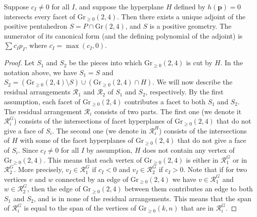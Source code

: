 \documentclass[10pt,a4paper]{amsart}
\begin{document}
\begin{theorem} \label{thm:penta}
    Suppose $c_I\neq 0$ for all $I$, and suppose the hyperplane $H$ defined by $h(\mathbf{p}) = 0$ intersects every facet of $\mathrm{Gr}_{\geq 0}(2,4)$. Then there exists a unique adjoint of the positive pentahedron $S = P \cap \mathrm{Gr}(2,4)$, and $S$ is a positive geometry. The numerator of its canonical form (and the defining polynomial of the adjoint) is $\sum \overline{c_I}p_I$, where $\overline{c_I} = \max (c_I, 0)$.
\end{theorem}

\begin{proof}
    Let $S_1$ and $S_2$ be the pieces into which $\mathrm{Gr}_{\geq 0}(2,4)$ is cut by $H$. In the notation above, we have $S_1 = S$ and $S_2 = (\mathrm{Gr}_{\geq 0}(2,4) \setminus S) \cup (\mathrm{Gr}_{\geq 0}(2,4) \cap H)$. We will now describe the residual arrangements $\mathcal{R}_1$ and $\mathcal{R}_2$ of $S_1$ and $S_2$, respectively. By the first assumption, each facet of $\mathrm{Gr}_{\geq 0}(2,4)$ contributes a facet to both $S_1$ and $S_2$. The residual arrangement $\mathcal{R}_i$ consists of two parts. The first one (we denote it $\mathcal{R}^G_i$) consists of the intersections of facet hyperplanes of $\mathrm{Gr}_{\geq 0}(2,4)$ that do not give a face of $S_i$. The second one (we denote in $\mathcal{R}^H_i$) consists of the intersections of $H$ with some of the facet hyperplanes of $\mathrm{Gr}_{\geq 0}(2,4)$ that do not give a face of $S_i$. Since $c_I\neq 0$ for all $I$ by assumption, $H$ does not contain any vertex of $\mathrm{Gr}_{\geq 0}(2,4)$. This means that each vertex of $\mathrm{Gr}_{\geq 0}(2,4)$ is either in $\mathcal{R}^G_{1}$ or in $\mathcal{R}^G_2$. More precisely, $v_I \in \mathcal{R}^G_{1}$ if $c_I <0$ and $v_I \in \mathcal{R}^G_2$ if $c_I > 0$. Note that if for two vertices $v$ and $w$ connected by an edge of $\mathrm{Gr}_{\geq 0}(2,4)$ we have $v \in \mathcal{R}^G_{1}$ and $w \in \mathcal{R}^G_2$, then the edge of $\mathrm{Gr}_{\geq 0}(2,4)$ between them contributes an edge to both $S_1$ and $S_2$, and is in none of the residual arrangements. This means that the span of $\mathcal{R}^G_i$ is equal to the span of the vertices of $\mathrm{Gr}_{\geq 0}(k,n)$ that are in $\mathcal{R}^G_i$. 


\end{proof}
\end{document}

